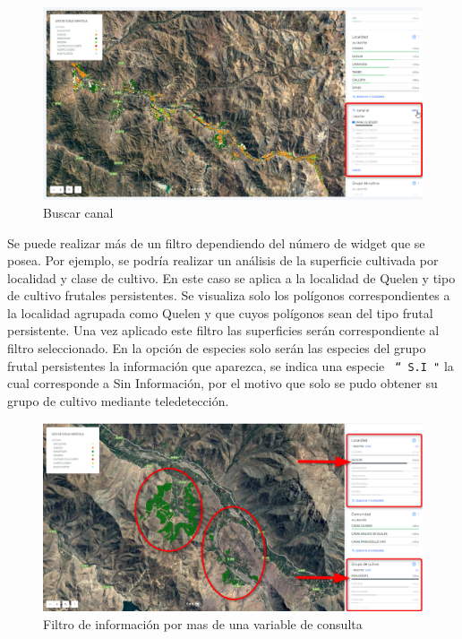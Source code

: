 \documentclass[10pt]{article}
\begin{document}
\begin{figure}[H]
\centering
\includegraphics[scale=0.5]{Figuras_manual/buscar_canal.png}
\caption{Buscar canal}
\label{7}
\end{figure}

Se puede realizar más de un filtro dependiendo del número de widget que se posea. Por ejemplo, se podría realizar un análisis de la superficie cultivada por localidad y clase de cultivo. En este caso se aplica a la localidad de Quelen y tipo de cultivo frutales persistentes. Se visualiza solo los polígonos correspondientes a la localidad agrupada como Quelen y que cuyos polígonos sean del tipo frutal persistente. Una vez aplicado este filtro las superficies serán correspondiente al filtro seleccionado. En la opción de especies solo serán las especies del grupo frutal persistentes la información que aparezca, se indica una especie \texttt{ “ S.I "} la cual corresponde a Sin Información, por el motivo que solo se pudo obtener su grupo de cultivo mediante teledetección.

\begin{figure}[H]
\centering
\includegraphics[width=\textwidth]{Figuras_manual/visor_2filtro.png}
\caption{Filtro de información por mas de una variable de consulta}
\end{figure}
\end{document}
